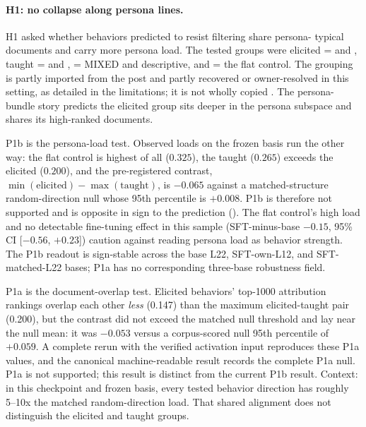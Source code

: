 \paragraph{H1: no collapse along persona lines.}
H1 asked whether behaviors predicted to resist filtering share persona-
typical documents and carry more persona load. The tested groups were
elicited =  and ,
taught =  and ,
 = MIXED and descriptive, and
 = the flat control. The grouping is partly
imported from the post and partly recovered or owner-resolved in this
setting, as detailed in the limitations; it is not wholly copied
\citep{lee2026filtering}. The persona-bundle story predicts the elicited
group sits deeper in the persona subspace and shares its high-ranked
documents.

P1b is the persona-load test. Observed loads on the frozen basis run the
other way: the flat control  is highest of all
($0.325$), the taught  ($0.265$) exceeds the
elicited  ($0.200$), and the pre-registered contrast,
$\min(\text{elicited}) - \max(\text{taught})$, is $-0.065$ against a
matched-structure random-direction null whose 95th percentile is $+0.008$.
P1b is therefore not supported and is opposite in sign to the prediction
(). The flat control's high load and no detectable fine-tuning
effect in this sample (SFT-minus-base $-0.15$, 95\% CI
[$-0.56$, $+0.23$]) caution against reading persona load as behavior
strength. The P1b readout is sign-stable across the base L22, SFT-own-L12,
and SFT-matched-L22 bases; P1a has no corresponding three-base robustness
field.

P1a is the document-overlap test. Elicited behaviors' top-1000 attribution
rankings overlap each other \emph{less} (0.147) than the maximum
elicited-taught pair (0.200), but the contrast did not exceed the matched
null threshold and lay near the null mean: it was $-0.053$ versus a
corpus-scored null 95th percentile of $+0.059$. A complete rerun with the
verified activation input reproduces these P1a values, and the canonical
machine-readable result records the complete P1a null. P1a is not
supported; this result is distinct from the current P1b result. Context: in this
checkpoint and frozen basis, every tested behavior direction has roughly
5--10x the matched random-direction load. That shared alignment does not
distinguish the elicited and taught groups.
